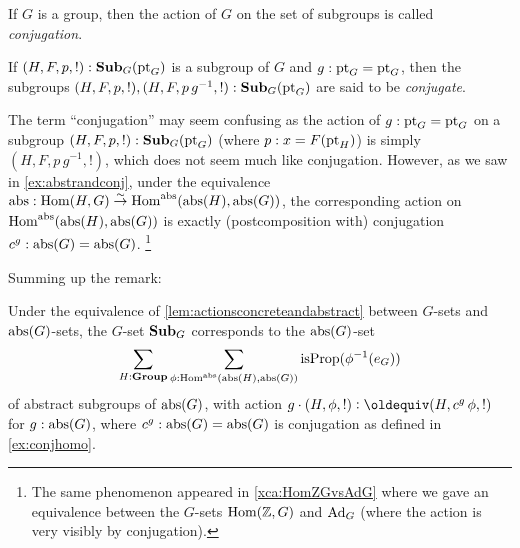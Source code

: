 \begin{definition}
  \label{def:conjactonsubgroups}
  If $G$ is a group, then the action of $G$ on the set of subgroups is called \emph{conjugation}. 


  \label{def:conjugate}
  If $(H,F,p,!):\mathbf{Sub}_G(\mathrm{pt}_G)$ is a subgroup of $G$ and $g:\mathrm{pt}_G=\mathrm{pt}_G$, then the subgroups  $(H,F,p,!),(H,F,p\,g^{-1},!):\mathbf{Sub}_G(\mathrm{pt}_G)$ are said to be \emph{conjugate}. 
\end{definition}
\begin{remark}
  \label{rem:whyconjugate}
  The term ``conjugation'' may seem confusing as the %
action of $g:\mathrm{pt}_G=\mathrm{pt}_G$ on a subgroup $(H,F,p,!):\mathbf{Sub}_G(\mathrm{pt}_G)$ (where $p:x=F(\mathrm{pt}_H)$) is simply $(H,F,p\,g^{-1},!)$, which does not seem much like conjugation.  
However, as we saw in \cref{ex:abstrandconj}, under the equivalence $\mathrm{abs}:\mathrm{Hom}(H,G)\overset\sim\to\mathrm{Hom}^{\mathrm{abs}}(\mathrm{abs}(H),\mathrm{abs}(G))$, the corresponding action on $\mathrm{Hom}^{\mathrm{abs}}(\mathrm{abs}(H),\mathrm{abs}(G))$ is exactly (postcomposition with) conjugation $c^g:\mathrm{abs}(G)=\mathrm{abs}(G)$.  
\footnote{The same phenomenon appeared in \cref{xca:HomZGvsAdG} where we gave an equivalence between the $G$-sets $\mathrm{Hom}(\mathbb{Z},G)$ and $\mathrm{Ad}_G$ (where the action is very visibly by conjugation).}

  \label{rem:conjactiononsubgroups}

\end{remark}
Summing up the remark:
\begin{lemma}
  \label{lem:conjugationabstractly}
  Under the equivalence of \cref{lem:actionsconcreteandabstract} between $G$-sets and $\mathrm{abs}(G)$-sets, the $G$-set $\mathbf{Sub}_G$ corresponds to the $\mathrm{abs}(G)$-set
$$\sum_{H:\mathbf{Group}}\sum_{\phi:\mathrm{Hom}^{\mathrm{abs}}(\mathrm{abs}(H),\mathrm{abs}(G))}\mathrm{isProp}(\phi^{-1}(e_G))$$ of abstract subgroups of $\mathrm{abs}(G)$, with action $g\cdot(H,\phi,!)\defequi(H,c^g\,\phi,!)$ for $g:\mathrm{abs}(G)$, where  $c^g:\mathrm{abs}(G)=\mathrm{abs}(G)$ is conjugation as defined in \cref{ex:conjhomo}.
\end{lemma}


